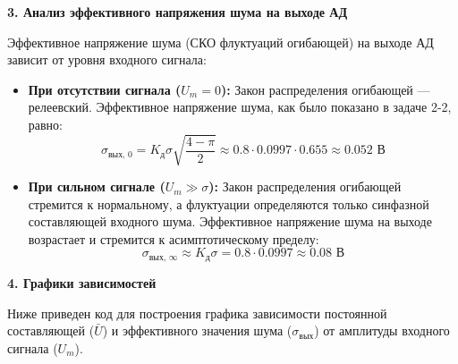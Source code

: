 \vspace{1em}
\textbf{3. Анализ эффективного напряжения шума на выходе АД}

Эффективное напряжение шума (СКО флуктуаций огибающей) на выходе АД зависит от уровня входного сигнала:
\begin{itemize}
    \item \textbf{При отсутствии сигнала ($U_m = 0$):} Закон распределения огибающей — релеевский. Эффективное напряжение шума, как было показано в задаче 2-2, равно:
    \begin{equation*}
        \sigma_{\text{вых, 0}} = K_{\text{д}} \sigma \sqrt{\frac{4-\pi}{2}} \approx 0.8 \cdot 0.0997 \cdot 0.655 \approx 0.052 \text{ В}
    \end{equation*}
    \item \textbf{При сильном сигнале ($U_m \gg \sigma$):} Закон распределения огибающей стремится к нормальному, а флуктуации определяются только синфазной составляющей входного шума. Эффективное напряжение шума на выходе возрастает и стремится к асимптотическому пределу:
    \begin{equation*}
        \sigma_{\text{вых, }\infty} \approx K_{\text{д}} \sigma = 0.8 \cdot 0.0997 \approx 0.08 \text{ В}
    \end{equation*}
\end{itemize}

\vspace{1em}
\textbf{4. Графики зависимостей}

Ниже приведен код для построения графика зависимости постоянной составляющей ($\bar{U}$) и эффективного значения шума ($\sigma_{\text{вых}}$) от амплитуды входного сигнала ($U_m$).

